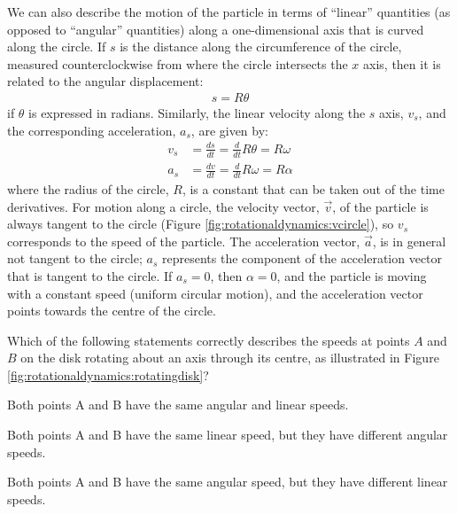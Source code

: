 We can also describe the motion of the particle in terms of ``linear'' quantities (as opposed to ``angular'' quantities) along a one-dimensional axis that is curved along the circle. If $s$ is the distance along the circumference of the circle, measured counterclockwise from where the circle intersects the $x$ axis, then it is related to the angular displacement:
\begin{align*}
s = R\theta
\end{align*}
if $\theta$ is expressed in radians. Similarly, the linear velocity along the $s$ axis, $v_s$, and the corresponding acceleration, $a_s$, are given by:
\begin{align*}
v_s &= \frac{ds}{dt} =\frac{d}{dt}R\theta = R\omega\\
a_s&= \frac{dv}{dt} =\frac{d}{dt}R\omega = R\alpha
\end{align*}
where the radius of the circle, $R$, is a constant that can be taken out of the time derivatives. For motion along a circle, the velocity vector, $\vec v$, of the particle is always tangent to the circle (Figure \ref{fig:rotationaldynamics:vcircle}), so $v_s$ corresponds to the speed of the particle. The acceleration vector, $\vec a$, is in general not tangent to the circle; $a_s$ represents the component of the acceleration vector that is tangent to the circle. If $a_s=0$, then $\alpha=0$, and the particle is moving with a constant speed (uniform circular motion), and the acceleration vector points towards the centre of the circle.

\begin{checkpoint}
\begin{MCquestion}{Which of the following statements correctly describes the speeds at points $A$ and $B$ on the disk rotating about an axis through its centre, as illustrated in Figure \ref{fig:rotationaldynamics:rotatingdisk}?
}
\item Both points A and B have the same angular and linear speeds.
\item Both points A and B have the same linear speed, but they have different angular speeds.
\item Both points A and B have the same angular speed, but they have different linear speeds. %
\end{MCquestion}
\end{checkpoint}


